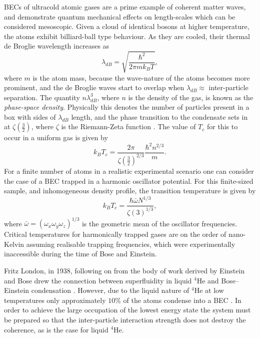BECs of ultracold atomic gases are a prime example of coherent matter waves, and demonstrate quantum mechanical effects on length-scales which can be considered mesoscopic. Given a cloud of identical bosons at higher temperature, the atoms exhibit billiard-ball type behaviour. As they are cooled, their thermal de Broglie wavelength increases as
\begin{equation}
\lambda_{dB} = \sqrt{\frac{\hbar^2}{2\pi mk_{B}T}},
\end{equation}
where $m$ is the atom mass, because the wave-nature of the atoms becomes more prominent, and the de Broglie waves start to overlap when $\lambda_{dB} \approx$ inter-particle separation. The quantity $n\lambda_{dB}^3$, where $n$ is the density of the gas, is known as the \emph{phase-space density}. Physically this denotes the number of particles present in a box with sides of $\lambda_{dB}$ length, and the phase transition to the condensate sets in at $\zeta\left(\frac{3}{2}\right)$, where $\zeta$ is the Riemann-Zeta function \cite{BK:Ueda_2010}. The value of $T_c$ for this to occur in a uniform gas is given by
\begin{equation}
k_BT_c = \frac{2\pi}{\zeta\left(\frac{3}{2}\right)^{2/3}}\frac{\hbar^2n^{2/3}}{m}.
\end{equation}
For a finite number of atoms in a realistic experimental scenario one can consider the case of a BEC trapped in a harmonic oscillator potential. For this finite-sized sample, and inhomogeneous density profile, the transition temperature is given by
\begin{equation}
k_BT_c = \frac{\hbar\bar{\omega}N^{1/3}}{\zeta(3)^{1/3}},
\end{equation}
where $\bar{\omega}=(\omega_x\omega_y\omega_z)^{1/3}$ is the geometric mean of the oscillator frequencies. Critical temperatures for harmonically trapped gases are on the order of nano-Kelvin assuming realisable trapping frequencies, which were experimentally inaccessible during the time of Bose and Einstein.

Fritz London, in 1938, following on from the body of work derived by Einstein and Bose drew the connection between superfluidity in liquid $^4$He and Bose--Einstein condensation \cite[Chap.~1]{BK:Pitaevskii_Stringari_2003}. However, due to the liquid nature of $^4$He at low temperatures only approximately $10\%$ of the atoms condense into a BEC \cite{BEC:Penrose_pr_1956}. In order to achieve the large occupation of the lowest energy state the system must be prepared so that the inter-particle interaction strength does not destroy the coherence, as is the case for liquid $^4$He.

